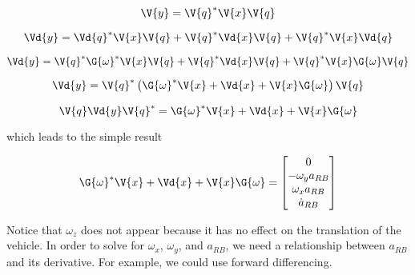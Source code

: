 \[
\V{y} = \V{q}^* \V{x} \V{q}
\]



\[
\Vd{y} = \Vd{q}^* \V{x} \V{q} + \V{q}^* \Vd{x} \V{q} + \V{q}^* \V{x} \Vd{q}
\]

\[
\Vd{y} = \V{q}^* \G{\omega}^* \V{x} \V{q} + \V{q}^* \Vd{x} \V{q} + \V{q}^* \V{x} \G{\omega} \V{q}
\]

\[
\Vd{y} = \V{q}^* \left( \G{\omega}^* \V{x} + \Vd{x} + \V{x} \G{\omega} \right) \V{q}
\]

\[
\V{q} \Vd{y} \V{q}^* = \G{\omega}^* \V{x} + \Vd{x} + \V{x} \G{\omega}
\]



which leads to the simple result

\[
\G{\omega}^* \V{x} + \Vd{x} + \V{x} \G{\omega} = 
\begin{bmatrix}
0 \\
- \omega_y a_{RB} \\
\omega_x a_{RB} \\
\dot{a}_{RB}
\end{bmatrix}
\]

Notice that $\omega_z$ does not appear because it has no effect on the translation of the vehicle.
In order to solve for $\omega_x$, $\omega_y$, and $a_{RB}$, we need a relationship between $a_{RB}$ and its derivative.
For example, we could use forward differencing.






